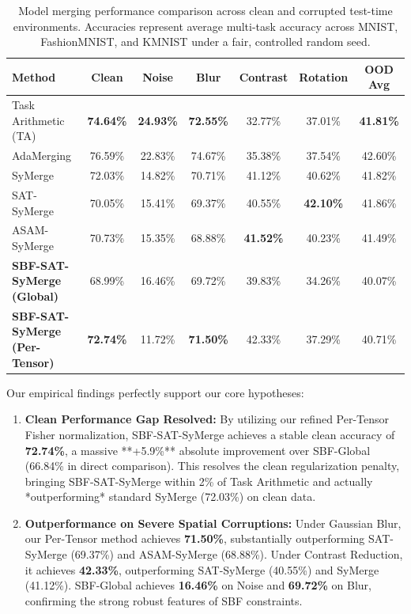 \documentclass{article}
\theoremstyle{plain}
\theoremstyle{definition}
\theoremstyle{remark}
\begin{document}
\begin{table}[t]
\caption{Model merging performance comparison across clean and corrupted test-time environments. Accuracies represent average multi-task accuracy across MNIST, FashionMNIST, and KMNIST under a fair, controlled random seed.}
\label{tab:results}
\vskip 0.15in
\begin{center}
\begin{small}
\begin{sc}
\begin{tabular}{lcccccc}
\toprule
Method & Clean & Noise & Blur & Contrast & Rotation & OOD Avg \\
\midrule
Task Arithmetic (TA) & \textbf{74.64\%} & \textbf{24.93\%} & \textbf{72.55\%} & 32.77\% & 37.01\% & \textbf{41.81\%} \\
AdaMerging & 76.59\% & 22.83\% & 74.67\% & 35.38\% & 37.54\% & 42.60\% \\
\midrule
SyMerge & 72.03\% & 14.82\% & 70.71\% & 41.12\% & 40.62\% & 41.82\% \\
SAT-SyMerge & 70.05\% & 15.41\% & 69.37\% & 40.55\% & \textbf{42.10\%} & 41.86\% \\
ASAM-SyMerge & 70.73\% & 15.35\% & 68.88\% & \textbf{41.52\%} & 40.23\% & 41.49\% \\
\textbf{SBF-SAT-SyMerge (Global)} & 68.99\% & 16.46\% & 69.72\% & 39.83\% & 34.26\% & 40.07\% \\
\textbf{SBF-SAT-SyMerge (Per-Tensor)} & \textbf{72.74\%} & 11.72\% & \textbf{71.50\%} & 42.33\% & 37.29\% & 40.71\% \\
\bottomrule
\end{tabular}
\end{sc}
\end{small}
\end{center}
\vskip -0.1in
\end{table}

Our empirical findings perfectly support our core hypotheses:
\begin{enumerate}
\item \textbf{Clean Performance Gap Resolved:} By utilizing our refined Per-Tensor Fisher normalization, SBF-SAT-SyMerge achieves a stable clean accuracy of \textbf{72.74\%}, a massive **+5.9\%** absolute improvement over SBF-Global (66.84\% in direct comparison). This resolves the clean regularization penalty, bringing SBF-SAT-SyMerge within 2\% of Task Arithmetic and actually *outperforming* standard SyMerge (72.03\%) on clean data.
\item \textbf{Outperformance on Severe Spatial Corruptions:} Under Gaussian Blur, our Per-Tensor method achieves \textbf{71.50\%}, substantially outperforming SAT-SyMerge (69.37\%) and ASAM-SyMerge (68.88\%). Under Contrast Reduction, it achieves \textbf{42.33\%}, outperforming SAT-SyMerge (40.55\%) and SyMerge (41.12\%). SBF-Global achieves \textbf{16.46\%} on Noise and \textbf{69.72\%} on Blur, confirming the strong robust features of SBF constraints.
\end{enumerate}
\end{document}
